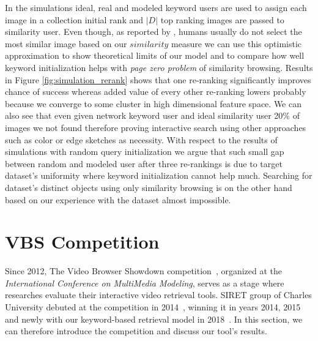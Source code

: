 In the simulations ideal, real and modeled keyword users are used to assign each image in a collection initial rank and $|D|$ top ranking images are passed to similarity user. Even though, as reported by \cite{kovalvcik2017comparison}, humans usually do not select the most similar image based on our $similarity$ measure we can use this optimistic approximation to show theoretical limits of our model and to compare how well keyword initialization helps with \textit{page zero problem} of similarity browsing.
Results in Figure \ref{fig:simulation_rerank} shows that one re-ranking significantly improves chance of success whereas added value of every other re-ranking lowers probably because we converge to some cluster in high dimensional feature space. We can also see that even given network keyword user and ideal similarity user 20\% of images we not found therefore proving interactive search using other approaches such as color or edge sketches as necessity. With respect to the results of simulations with random query initialization we argue that such small gap between random and modeled user after three re-rankings is due to target dataset's uniformity where keyword initialization cannot help much. Searching for dataset's distinct objects using only similarity browsing is on the other hand based on our experience with the dataset almost impossible.



\section{VBS Competition}

Since 2012, The Video Browser Showdown competition~\cite{cobarzan2017interactive,Lokoc-influential-trends}, organized at the \textit{International Conference on MultiMedia Modeling}, serves as a stage where researches evaluate their interactive video retrieval tools. SIRET group of Charles University debuted at the competition in 2014~\cite{Lokoc-VBS2014}, winning it in years 2014, 2015 and newly with our keyword-based retrieval model in 2018~\cite{lokovc2018revisiting}. In this section, we can therefore introduce the competition and discuss our tool's results.

